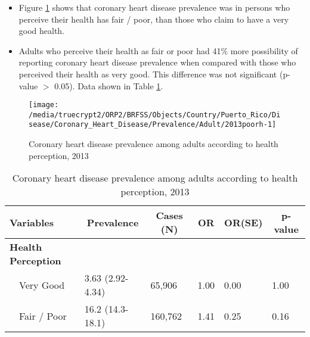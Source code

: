  \begin{itemize}

\item Figure \ref{fig:fairpoor.Coronary_Heart_Disease.2013} shows that coronary heart disease prevalence  was 
 in persons who perceive their health has fair / poor,
than those who claim to have a very good health.

\item Adults who perceive their health as fair or poor had 41\% more possibility of reporting coronary heart disease prevalence when compared with those who perceived their health as very good. This difference was not significant (p-value $>$ 0.05). Data shown in Table \ref{tab:fairpoor.Coronary_Heart_Disease.2013}.

\end{itemize}

\begin{figure}[H]
\caption{Coronary heart disease prevalence among adults according to health perception,
         2013}
\label{fig:fairpoor.Coronary_Heart_Disease.2013}

\begin{knitrout}
\color{fgcolor}

{\centering \texttt{[image: /media/truecrypt2/ORP2/BRFSS/Objects/Country/Puerto\_Rico/Disease/Coronary\_Heart\_Disease/Prevalence/Adult/2013poorh-1]} 

}



\end{knitrout}
 \end{figure}

\begin{table}[H]
\caption{Coronary heart disease prevalence  among adults according to health perception, 2013\label{tab:fairpoor.Coronary_Heart_Disease.2013}} 
\begin{center}
\begin{tabular}{llllll}
\hline\hline
\multicolumn{1}{l}{Variables}&\multicolumn{1}{c}{Prevalence}&\multicolumn{1}{c}{Cases (N)}&\multicolumn{1}{c}{OR}&\multicolumn{1}{c}{OR(SE)}&\multicolumn{1}{c}{p-value}\tabularnewline
\hline
{\bfseries Health Perception}&&&&&\tabularnewline
~~Very Good&3.63 (2.92-4.34)& 65,906&1.00&0.00&1.00\tabularnewline
~~Fair / Poor&16.2 (14.3-18.1)&160,762&1.41&0.25&0.16\tabularnewline
\hline
\end{tabular}\end{center}

\end{table}

